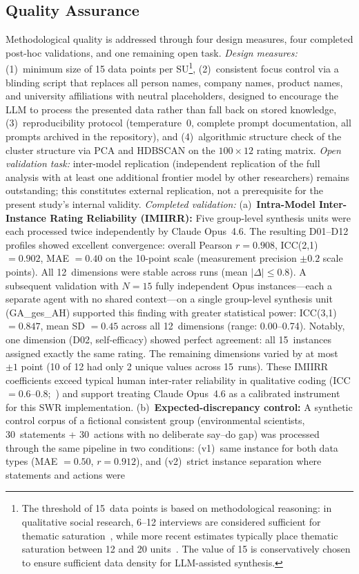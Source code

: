 \documentclass[12pt,a4paper]{article}
\begin{document}
\subsection{Quality Assurance}
\label{sec:methodik:qualitaet}

Methodological quality is addressed through four design measures, four completed post-hoc validations, and one remaining open task. \emph{Design measures:} (1)~minimum size of 15 data points per SU\footnote{The threshold of 15~data points is based on methodological reasoning: in qualitative social research, 6--12 interviews are considered sufficient for thematic saturation~\citep{StraussCorbin1990}, while more recent estimates typically place thematic saturation between 12 and 20 units~\citep{Guest2006, FugardPotts2015}. The value of 15 is conservatively chosen to ensure sufficient data density for LLM-assisted synthesis.}, (2)~consistent focus control via a blinding script that replaces all person names, company names, product names, and university affiliations with neutral placeholders, designed to encourage the LLM to process the presented data rather than fall back on stored knowledge, (3)~reproducibility protocol (temperature~0, complete prompt documentation, all prompts archived in the repository), and (4)~algorithmic structure check of the cluster structure via PCA and HDBSCAN on the $100 \times 12$ rating matrix. \emph{Open validation task:} inter-model replication (independent replication of the full analysis with at least one additional frontier model by other researchers) remains outstanding; this constitutes external replication, not a prerequisite for the present study's internal validity. \emph{Completed validation:} (a)~\textbf{Intra-Model Inter-Instance Rating Reliability (IMIIRR):} Five group-level synthesis units were each processed twice independently by Claude Opus~4.6. The resulting D01--D12 profiles showed excellent convergence: overall Pearson $r = 0.908$, ICC(2,1) $= 0.902$, MAE $= 0.40$ on the 10-point scale (measurement precision $\pm 0.2$ scale points). All 12~dimensions were stable across runs (mean $|\Delta| \leq 0.8$). A subsequent validation with $N = 15$ fully independent Opus instances---each a separate agent with no shared context---on a single group-level synthesis unit (GA\_ges\_AH) supported this finding with greater statistical power: ICC(3,1) $= 0.847$, mean SD $= 0.45$ across all 12~dimensions (range: 0.00--0.74). Notably, one dimension (D02, self-efficacy) showed perfect agreement: all 15~instances assigned exactly the same rating. The remaining dimensions varied by at most $\pm 1$ point (10 of 12 had only 2 unique values across 15~runs). These IMIIRR coefficients exceed typical human inter-rater reliability in qualitative coding (ICC $= 0.6$--$0.8$;~\citealt{Hallgren2012}) and support treating Claude Opus~4.6 as a calibrated instrument for this SWR implementation. (b)~\textbf{Expected-discrepancy control:} A synthetic control corpus of a fictional consistent group (environmental scientists, 30~statements + 30~actions with no deliberate say--do gap) was processed through the same pipeline in two conditions: (v1)~same instance for both data types (MAE $= 0.50$, $r = 0.912$), and (v2)~strict instance separation where statements and actions were 
\end{document}

